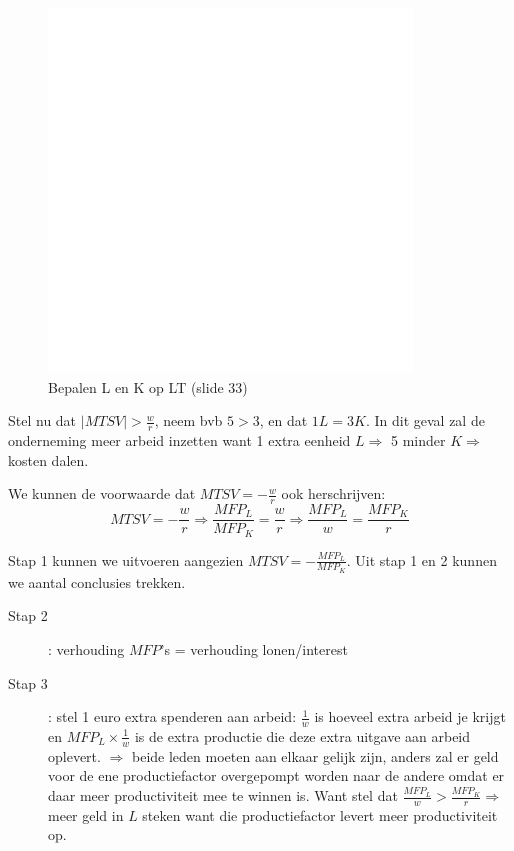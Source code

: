 \begin{figure}[htbp]
	\centering
	\includegraphics[scale=0.4]{Images/white.png}
	\caption{Bepalen L en K op LT (slide 33)}
	\label{fig:prodNiveauLT}
\end{figure}

Stel nu dat $|MTSV| > \frac{w}{r}$, neem bvb $5 > 3$, en dat $1L = 3K$. In dit geval zal de onderneming meer arbeid inzetten want 1 extra eenheid $L\Rightarrow$ 5 minder $K\Rightarrow$ kosten dalen.

We kunnen de voorwaarde dat $MTSV = -\frac{w}{r}$ ook herschrijven:
\begin{equation}
	MTSV = -\frac{w}{r} \Rightarrow \frac{MFP_L}{MFP_K} = \frac{w}{r} \Rightarrow \frac{MFP_L}{w} = \frac{MFP_K}{r}
\end{equation}

Stap 1 kunnen we uitvoeren aangezien $MTSV = -\frac{MFP_L}{MFP_K}$. Uit stap 1 en 2 kunnen we aantal conclusies trekken.
\begin{description}
	\item[Stap 2]: verhouding $MFP$'s = verhouding lonen/interest
	\item[Stap 3]: stel 1 euro extra spenderen aan arbeid: $\frac{1}{w}$ is hoeveel extra arbeid je krijgt en $MFP_L \times \frac{1}{w}$ is de extra productie die deze extra uitgave aan arbeid oplevert. $\Rightarrow$ beide leden moeten aan elkaar gelijk zijn, anders zal er geld voor de ene productiefactor overgepompt worden naar de andere omdat er daar meer productiviteit mee te winnen is. Want stel dat $\frac{MFP_L}{w} > \frac{MFP_K}{r} \Rightarrow$ meer geld in $L$ steken want die productiefactor levert meer productiviteit op.
\end{description}

